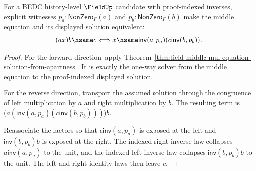 \begin{theorem}
\label{thm:field-middle-mul-equation-exact-from-apartness}
For a BEDC history-level $\FieldUp$ candidate with proof-indexed inverses,
explicit witnesses $p_a:\mathsf{NonZero}_F(a)$ and
$p_b:\mathsf{NonZero}_F(b)$ make the middle equation and its displayed
solution equivalent:
$$
(a x)b\hsame c
\Longleftrightarrow
x\hsame \mathsf{inv}(a,p_a)(c\mathsf{inv}(b,p_b)).
$$
\end{theorem}
\begin{proof}
For the forward direction, apply
Theorem~\ref{thm:field-middle-mul-equation-solution-from-apartness}. It is
exactly the one-way solver from the middle equation to the proof-indexed
displayed solution.

For the reverse direction, transport the assumed solution through the
congruence of left multiplication by $a$ and right multiplication by $b$.
The resulting term is
$\bigl(a(\mathsf{inv}(a,p_a)(c\mathsf{inv}(b,p_b)))\bigr)b$.

Reassociate the factors so that $a\mathsf{inv}(a,p_a)$ is exposed at the
left and $\mathsf{inv}(b,p_b)b$ is exposed at the right. The indexed right
inverse law collapses $a\mathsf{inv}(a,p_a)$ to the unit, and the indexed
left inverse law collapses $\mathsf{inv}(b,p_b)b$ to the unit. The left and
right identity laws then leave $c$.
\end{proof}
